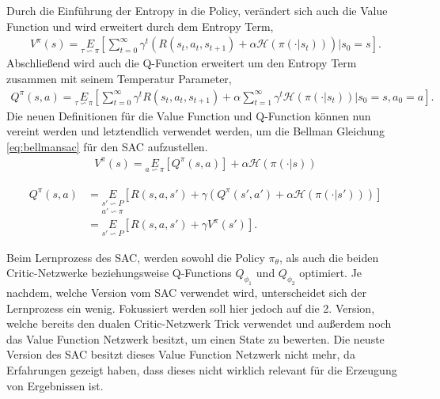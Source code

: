 \documentclass[]{iat}
\begin{document}
Durch die Einführung der Entropy in die Policy, verändert sich auch die Value Function und wird erweitert durch dem Entropy Term,
\begin{align}
    V^{\pi}(s) = \underset{\tau \backsim \pi}{E}\left[\sum_{t = 0}^{\infty} \gamma^t\left(R(s_t, a_t, s_{t+1}) + \alpha \mathcal{H}(\pi(\cdot | s_t))\right) \vert  s_0 = s \right].
\end{align}
Abschließend wird auch die Q-Function erweitert um den Entropy Term zusammen mit seinem Temperatur Parameter,
\begin{align}
    Q^{\pi}(s, a) = \underset{\tau \backsim \pi}{E}\left[\sum_{t = 0}^{\infty} \gamma^t R(s_t, a_t, s_{t+1}) + \alpha \sum_{t = 1}^{\infty} \gamma^t \mathcal{H}(\pi(\cdot | s_t)) \vert s_0 = s, a_0 = a \right].
\end{align}
Die neuen Definitionen für die Value Function und Q-Function können nun vereint werden und letztendlich verwendet werden, um die Bellman Gleichung \ref{eq:bellmansac} für den SAC aufzustellen. \cite[]{sacv2} \cite[]{brockman2016openai}
\begin{align}
    V^{\pi}(s) = \underset{a \backsim \pi}{E} \left[Q^{\pi}(s, a)\right] + \alpha \mathcal{H}(\pi(\cdot | s)) \label{eq:value_sac}
\end{align}

\begin{align}
    Q^{\pi}(s,a) & = \underset{a' \backsim \pi}{\underset{s' \backsim P}{E}} \left[R(s, a, s') + \gamma (Q^{\pi}(s', a') + \alpha \mathcal{H}(\pi(\cdot | s')))\right] \\
                 & = \underset{s' \backsim P}{E} \left[R(s,a,s') + \gamma V^{\pi}(s')\right]. \label{eq:bellmansac}
\end{align}

Beim Lernprozess des SAC, werden sowohl die Policy $\pi_{\theta}$, als auch die beiden Critic-Netzwerke beziehungsweise Q-Functions $Q_{\phi_1}$ und $Q_{\phi_2}$ optimiert. Je nachdem, welche Version vom SAC verwendet wird, unterscheidet sich der Lernprozess ein wenig. Fokussiert werden soll hier jedoch auf die 2. Version, welche bereits den dualen Critic-Netzwerk Trick verwendet und außerdem noch das Value Function Netzwerk besitzt, um einen State zu bewerten. Die neuste Version des SAC besitzt dieses Value Function Netzwerk nicht mehr, da Erfahrungen gezeigt haben, dass dieses nicht wirklich relevant für die Erzeugung von Ergebnissen ist. \cite[]{sacv3}
\end{document}

